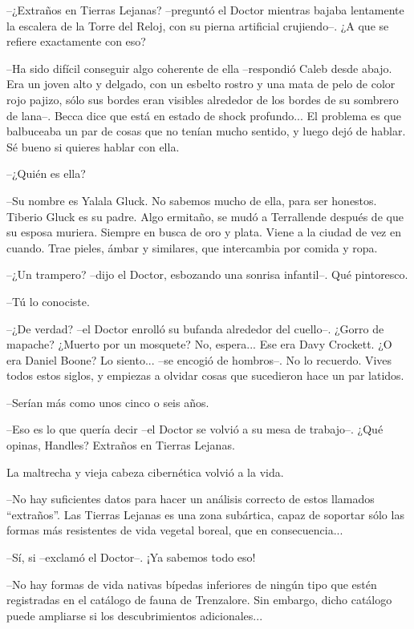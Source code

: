 --¿Extraños en Tierras Lejanas? --preguntó el Doctor mientras bajaba lentamente la escalera de la Torre del Reloj, con su pierna artificial crujiendo--. ¿A que se refiere exactamente con eso?
 
--Ha sido difícil conseguir algo coherente de ella --respondió Caleb desde abajo. Era un joven alto y delgado, con un esbelto rostro y una mata de pelo de color rojo pajizo, sólo sus bordes eran visibles alrededor de los bordes de su sombrero de lana--. Becca dice que está en estado de shock profundo... El problema es que balbuceaba un par de cosas que no tenían mucho sentido, y luego dejó de hablar. Sé bueno si quieres hablar con ella.
 
--¿Quién es ella?
 
--Su nombre es Yalala Gluck. No sabemos mucho de ella, para ser honestos. Tiberio Gluck es su padre. Algo ermitaño, se mudó a Terrallende después de que su esposa muriera. Siempre en busca de oro y plata. Viene a la ciudad de vez en cuando. Trae pieles, ámbar y similares, que intercambia por comida y ropa.
 
--¿Un trampero? --dijo el Doctor, esbozando una sonrisa infantil--. Qué pintoresco.
 
--Tú lo conociste.
 
--¿De verdad? --el Doctor enrolló su bufanda alrededor del cuello--. ¿Gorro de mapache? ¿Muerto por un mosquete? No, espera... Ese era Davy Crockett. ¿O era Daniel Boone? Lo siento... --se encogió de hombros--. No lo recuerdo. Vives todos estos siglos, y empiezas a olvidar cosas que sucedieron hace un par latidos.
 
--Serían más como unos cinco o seis años.
 
--Eso es lo que quería decir --el Doctor se volvió a su mesa de trabajo--. ¿Qué opinas, Handles? Extraños en Tierras Lejanas.
 
La maltrecha y vieja cabeza cibernética volvió a la vida.
 
--No hay suficientes datos para hacer un análisis correcto de estos llamados ``extraños''. Las Tierras Lejanas es una zona subártica, capaz de soportar sólo las formas más resistentes de vida vegetal boreal, que en consecuencia...
 
--Sí, si --exclamó el Doctor--. ¡Ya sabemos todo eso!
 
--No hay formas de vida nativas bípedas inferiores de ningún tipo que estén registradas en el catálogo de fauna de Trenzalore. Sin embargo, dicho catálogo puede ampliarse si los descubrimientos adicionales...
 
